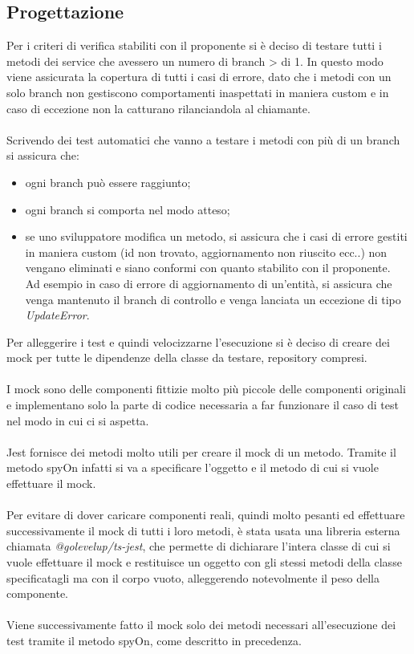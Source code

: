 \subsection{Progettazione}
Per i criteri di verifica stabiliti con il proponente si è deciso di testare tutti i metodi dei service che
avessero un numero di branch > di 1. In questo modo viene assicurata la copertura di tutti i casi di errore,
dato che i metodi con un solo branch 
non gestiscono comportamenti inaspettati in maniera custom e in caso di eccezione non la catturano 
rilanciandola al chiamante.
\\\\
Scrivendo dei test automatici che vanno a testare i metodi con più di un branch si assicura che:
\begin{itemize}
    \item ogni branch può essere raggiunto;
    \item ogni branch si comporta nel modo atteso;
    \item se uno sviluppatore modifica un metodo, si assicura che i casi di errore gestiti in maniera custom (id non trovato, 
    aggiornamento non riuscito ecc..) non vengano eliminati e siano conformi con quanto stabilito con il proponente. 
    \\
    Ad esempio in caso di errore di aggiornamento di un'entità, si assicura che venga mantenuto il branch di controllo e
    venga lanciata un eccezione di tipo \textit{UpdateError}.
\end{itemize}
\leavevmode\newline
Per alleggerire i test e quindi velocizzarne l'esecuzione si è deciso di creare dei \gls{mock} per tutte le dipendenze
della classe da testare, repository compresi.
\\\\
I \gls{mock} sono delle componenti fittizie molto più piccole delle componenti originali e implementano solo la parte di codice 
necessaria a far funzionare il caso di test nel modo in cui ci si aspetta.
\\\\
Jest fornisce dei metodi molto utili per creare il \gls{mock} di un metodo.
Tramite il metodo spyOn infatti si va a specificare l'oggetto e il metodo di cui si vuole effettuare il \gls{mock}.
\\\\
Per evitare di dover caricare componenti reali, quindi molto pesanti ed effettuare successivamente il \gls{mock} di tutti i loro metodi, è stata
usata una libreria esterna chiamata \textit{@golevelup/ts-jest}, che permette di dichiarare l'intera classe di cui si vuole effettuare
il \gls{mock} e restituisce un oggetto con gli stessi metodi della classe specificatagli ma con il corpo vuoto, 
alleggerendo notevolmente il peso della componente.
\\\\
Viene successivamente fatto il \gls{mock} solo dei metodi necessari all'esecuzione dei test tramite il metodo
spyOn, come descritto in precedenza.
\clearpage
